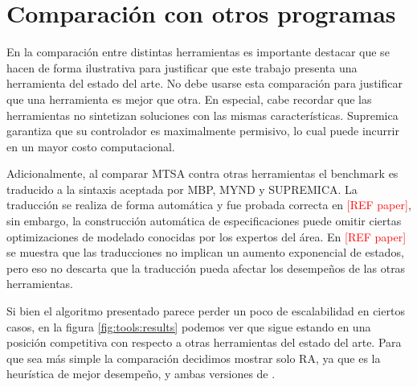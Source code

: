 \section{Comparación con otros programas}

En la comparación entre distintas herramientas es importante destacar que se hacen de forma ilustrativa para justificar que este trabajo presenta una herramienta del estado del arte. No debe usarse esta comparación para justificar que una herramienta es mejor que otra. En especial, cabe recordar que las herramientas no sintetizan soluciones con las mismas características. Supremica garantiza que su controlador es maximalmente permisivo, lo cual puede incurrir en un mayor costo computacional. 

Adicionalmente, al comparar MTSA contra otras herramientas el benchmark es traducido a la sintaxis aceptada por MBP, MYND y SUPREMICA. La traducción se realiza de forma automática y fue probada correcta en \textcolor{red}{[REF paper]}, sin embargo, la construcción automática de especificaciones puede omitir ciertas optimizaciones de modelado conocidas por los expertos del área. En \textcolor{red}{[REF paper]} se muestra que las traducciones no implican un aumento exponencial de estados, pero eso no descarta que la traducción pueda afectar los desempeños de las otras herramientas.

Si bien el algoritmo presentado parece perder un poco de escalabilidad en ciertos casos, en la figura \ref{fig:tools:results} podemos ver que sigue estando en una posición competitiva con respecto a otras herramientas del estado del arte. Para que sea más simple la comparación decidimos mostrar solo RA, ya que es la heurística de mejor desempeño, y ambas versiones de \DCS. 

